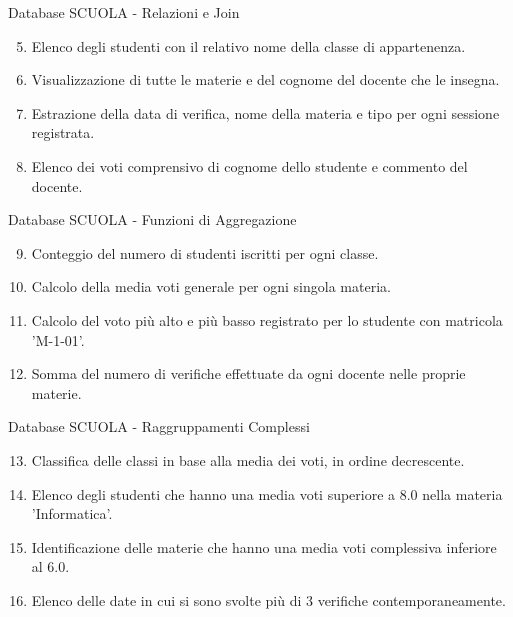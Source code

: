 \documentclass{beamer}
\begin{document}
\begin{frame}{Database SCUOLA - Relazioni e Join}

    \vfill
    \begin{enumerate}
        \setcounter{enumi}{4}
        \item Elenco degli studenti con il relativo nome della classe di appartenenza.
        \item Visualizzazione di tutte le materie e del cognome del docente che le insegna.
        \item Estrazione della data di verifica, nome della materia e tipo per ogni sessione registrata.
        \item Elenco dei voti comprensivo di cognome dello studente e commento del docente.
    \end{enumerate}
    \vfill
\end{frame}

\begin{frame}{Database SCUOLA - Funzioni di Aggregazione}

    \vfill
    \begin{enumerate}
        \setcounter{enumi}{8}
        \item Conteggio del numero di studenti iscritti per ogni classe.
        \item Calcolo della media voti generale per ogni singola materia.
        \item Calcolo del voto più alto e più basso registrato per lo studente con matricola 'M-1-01'.
        \item Somma del numero di verifiche effettuate da ogni docente nelle proprie materie.
    \end{enumerate}
    \vfill
\end{frame}

\begin{frame}{Database SCUOLA - Raggruppamenti Complessi}

    \vfill
    \begin{enumerate}
        \setcounter{enumi}{12}
        \item Classifica delle classi in base alla media dei voti, in ordine decrescente.
        \item Elenco degli studenti che hanno una media voti superiore a 8.0 nella materia 'Informatica'.
        \item Identificazione delle materie che hanno una media voti complessiva inferiore al 6.0.
        \item Elenco delle date in cui si sono svolte più di 3 verifiche contemporaneamente.
    \end{enumerate}
    \vfill
\end{frame}
\end{document}
